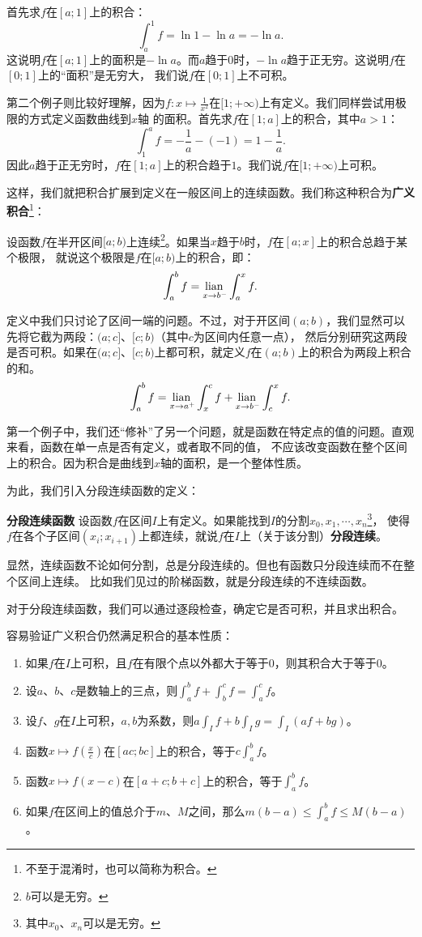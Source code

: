 \documentclass[12pt,UTF8,fontset=none]{ctexbook}
\begin{document}
首先求$f$在$[a;1]$上的积合：
$$ \int_a^1 f = \ln{1} - \ln{a} = -\ln{a}. $$
这说明$f$在$[a;1]$上的面积是$-\ln{a}$。而$a$趋于$0$时，$-\ln{a}$趋于正无穷。这说明$f$在$[0;1]$上的“面积”是无穷大，
我们说$f$在$[0;1]$上不可积。

第二个例子则比较好理解，因为$f:x\mapsto \frac{1}{x^2}$在$[1;+\infty)$上有定义。我们同样尝试用极限的方式定义函数曲线到$x$轴
的面积。首先求$f$在$[1;a]$上的积合，其中$a>1$：
$$ \int_1^a f = -\frac{1}{a} - (-1) = 1 - \frac{1}{a}. $$
因此$a$趋于正无穷时，$f$在$[1;a]$上的积合趋于$1$。我们说$f$在$[1;+\infty)$上可积。

这样，我们就把积合扩展到定义在一般区间上的连续函数。我们称这种积合为\textbf{广义积合}\footnote{不至于混淆时，也可以简称为积合。}：
\begin{df}
    设函数$f$在半开区间$[a;b)$上连续\footnote{$b$可以是无穷。}。如果当$x$趋于$b$时，$f$在$[a;x]$上的积合总趋于某个极限，
    就说这个极限是$f$在$[a;b)$上的积合，即：
    $$ \int_a^b f = \underset{x\to b^-}{\operatorname{lian}\,} \int_a^x f. $$
\end{df}

定义中我们只讨论了区间一端的问题。不过，对于开区间$(a;b)$，我们显然可以先将它截为两段：$(a;c]$、$[c;b)$（其中$c$为区间内任意一点），
然后分别研究这两段是否可积。如果在$(a;c]$、$[c;b)$上都可积，就定义$f$在$(a;b)$上的积合为两段上积合的和。
$$ \int_a^b f = \underset{x\to a^+}{\operatorname{lian}\,} \int_x^c f + \underset{x\to b^-}{\operatorname{lian}\,} \int_c^x f. $$ 

第一个例子中，我们还“修补”了另一个问题，就是函数在特定点的值的问题。直观来看，函数在单一点是否有定义，或者取不同的值，
不应该改变函数在整个区间上的积合。因为积合是曲线到$x$轴的面积，是一个整体性质。

为此，我们引入分段连续函数的定义：
\begin{df}{\textbf{分段连续函数}}
    设函数$f$在区间$I$上有定义。如果能找到$I$的分割$x_0, x_1, \cdots, x_n$\footnote{其中$x_0$、$x_n$可以是无穷。}，
    使得$f$在各个子区间$(x_i;x_{i+1})$上都连续，就说$f$在$I$上（关于该分割）\textbf{分段连续}。
\end{df}
显然，连续函数不论如何分割，总是分段连续的。但也有函数只分段连续而不在整个区间上连续。
比如我们见过的阶梯函数，就是分段连续的不连续函数。

对于分段连续函数，我们可以通过逐段检查，确定它是否可积，并且求出积合。

容易验证广义积合仍然满足积合的基本性质：
\begin{enumerate}
    \item 如果$f$在$I$上可积，且$f$在有限个点以外都大于等于$0$，则其积合大于等于$0$。
    \item 设$a$、$b$、$c$是数轴上的三点，则$\int_a^b f + \int_b^c f = \int_a^c f$。
    \item 设$f$、$g$在$I$上可积，$a, b$为系数，则$ a \int_I f + b \int_I g = \int_I (af + bg) $。
    \item 函数$x\mapsto f\left(\frac{x}{c}\right)$在$[ac; bc]$上的积合，等于$c\int_a^b f$。
    \item 函数$x\mapsto f(x-c)$在$[a+c;b+c]$上的积合，等于$\int_a^b f$。
    \item 如果$f$在区间上的值总介于$m$、$M$之间，那么$m(b - a) \leqslant \int_a^b f \leqslant M(b - a)$。
\end{enumerate}
\end{document}
